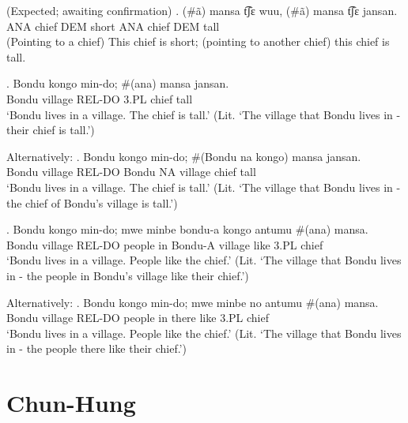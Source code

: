 \documentclass{assets/fieldnotes}
\begin{document}
(Expected; awaiting confirmation)
\exg. (\#ã) mansa t͡ʃɛ wuu, (\#ã) mansa t͡ʃɛ jansan.\\
    ANA chief DEM short ANA chief DEM tall\\
    (Pointing to a chief) This chief is short; (pointing to another chief) this chief is tall.

\exg. Bondu kongo min-do; \#(ana) mansa jansan.\\
    Bondu village REL-DO 3.PL chief tall\\
    `Bondu lives in a village. The chief is tall.' (Lit. `The village that Bondu lives in - their chief is tall.')

    
Alternatively:
\exg. Bondu kongo min-do; \#(Bondu na kongo) mansa jansan.\\
    Bondu village REL-DO Bondu NA village chief tall\\
    `Bondu lives in a village. The chief is tall.' (Lit. `The village that Bondu lives in - the chief of Bondu's village is tall.')

\exg. Bondu kongo min-do; mwe minbe bondu-a kongo antumu \#(ana) mansa.\\
    Bondu village REL-DO people in Bondu-A village like 3.PL chief\\
    `Bondu lives in a village. People like the chief.' (Lit. `The village that Bondu lives in - the people in Bondu's village like their chief.')

Alternatively:
\exg. Bondu kongo min-do; mwe minbe no antumu \#(ana) mansa.\\
    Bondu village REL-DO people in there like 3.PL chief\\
    `Bondu lives in a village. People like the chief.' (Lit. `The village that Bondu lives in - the people there like their chief.')

\section{Chun-Hung}

 \newline

\end{document}
